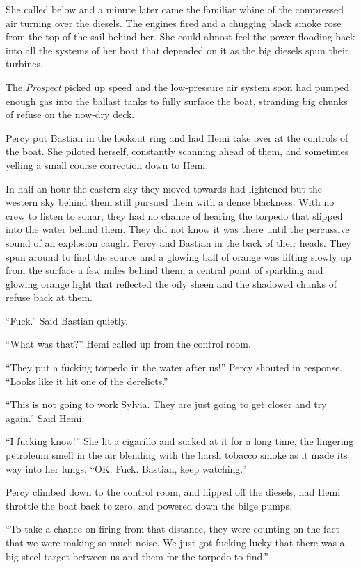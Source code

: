\documentclass[
]{scrbook}
\begin{document}
She called below and a minute later came the familiar whine of the
compressed air turning over the diesels. The engines fired and a
chugging black smoke rose from the top of the sail behind her. She could
almost feel the power flooding back into all the systems of her boat
that depended on it as the big diesels spun their turbines.

The \emph{Prospect} picked up speed and the low-pressure air system soon
had pumped enough gas into the ballast tanks to fully surface the boat,
stranding big chunks of refuse on the now-dry deck.

Percy put Bastian in the lookout ring and had Hemi take over at the
controls of the boat. She piloted herself, constantly scanning ahead of
them, and sometimes yelling a small course correction down to Hemi.

In half an hour the eastern sky they moved towards had lightened but the
western sky behind them still pursued them with a dense blackness. With
no crew to listen to sonar, they had no chance of hearing the torpedo
that slipped into the water behind them. They did not know it was there
until the percussive sound of an explosion caught Percy and Bastian in
the back of their heads. They spun around to find the source and a
glowing ball of orange was lifting slowly up from the surface a few
miles behind them, a central point of sparkling and glowing orange light
that reflected the oily sheen and the shadowed chunks of refuse back at
them.

``Fuck.'' Said Bastian quietly.

``What was that?'' Hemi called up from the control room.

``They put a fucking torpedo in the water after us!'' Percy shouted in
response. ``Looks like it hit one of the derelicts.''

``This is not going to work Sylvia. They are just going to get closer
and try again.'' Said Hemi.

``I fucking know!'' She lit a cigarillo and sucked at it for a long
time, the lingering petroleum smell in the air blending with the harsh
tobacco smoke as it made its way into her lungs. ``OK. Fuck. Bastian,
keep watching.''

Percy climbed down to the control room, and flipped off the diesels, had
Hemi throttle the boat back to zero, and powered down the bilge pumps.

``To take a chance on firing from that distance, they were counting on
the fact that we were making so much noise. We just got fucking lucky
that there was a big steel target between us and them for the torpedo to
find.''
\end{document}

